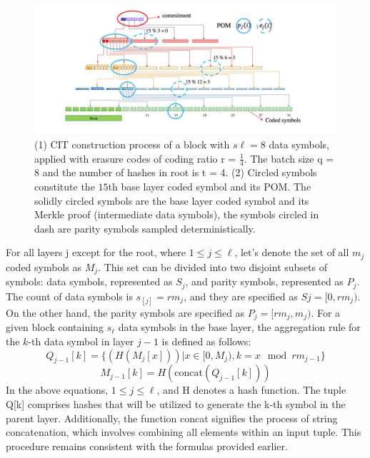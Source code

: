 \documentclass{report}
\begin{document}
\begin{center}
	\begin{figure}
		\centering
		\includegraphics[width=0.8\linewidth]{Fig/F2}
		\caption{(1) CIT construction process of a block with $s\ell = 8$ data symbols, applied with erasure codes of coding ratio r = $\frac{1}{4}$. The batch size q = 8 and the number of hashes in root is t = 4. (2) Circled symbols constitute the $15$th base layer coded symbol and its POM. The solidly circled symbols are the base layer coded symbol and its Merkle proof (intermediate data symbols), the symbols circled in dash are parity symbols sampled deterministically.
		}
		\label{fig:f2}
	\end{figure}
\end{center}
For all layers j except for the root, where $1 \leq j \leq \ell$, let's denote the set of all $m_{j}$ coded symbols as $M_{j}$. This set can be divided into two disjoint subsets of symbols: data symbols, represented as $S_{j}$, and parity symbols, represented as $P_{j}$. The count of data symbols is $s_[j] = rm_{j}$, and they are specified as $Sj = [0, rm_{j})$. On the other hand, the parity symbols are specified as $P_{j} = [rm_{j}, m_{j})$. For a given block containing $s_{\ell}$ data symbols in the base layer, the aggregation rule for the $k$-th data symbol in layer $j - 1$ is defined as follows:
\begin{equation} 
	Q_{j-1}[k] = \{(H(M_{j}[x])) | x \in [0, M_{j}), k = x \mod rm_{j - 1}\}
\end{equation}
\begin{equation} 
	M_{j-1}[k] = H(\text{concat}(Q_{j-1}[k])) 
\end{equation}
In the above equations, $1 \leq j \leq \ell$, and H denotes a hash function. The tuple Q[k] comprises hashes that will be utilized to generate the k-th symbol in the parent layer. Additionally, the function concat signifies the process of string concatenation, which involves combining all elements within an input tuple. This procedure remains consistent with the formulas provided earlier.\\
\end{document}
